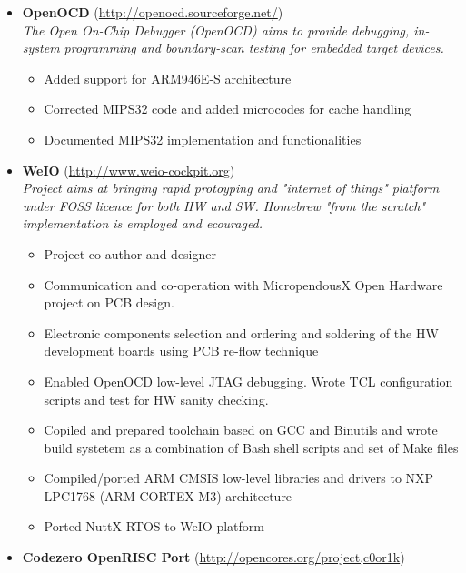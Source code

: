 \documentclass[a4paper, oneside, final]{scrartcl}
\begin{document}
\begin{itemize}
   \item \textbf{OpenOCD} (\url{http://openocd.sourceforge.net/}) \\
      \textit{The Open On-Chip Debugger (OpenOCD) aims to provide debugging,
         in-system programming and boundary-scan testing for embedded target
            devices.}
      \begin{itemize}
         \item Added support for ARM946E-S architecture
         \item Corrected MIPS32 code and added microcodes for cache handling
         \item Documented MIPS32 implementation and functionalities
      \end{itemize}
   \item \textbf{WeIO} (\url{http://www.weio-cockpit.org}) \\
      \textit{Project aims at bringing rapid protoyping and "internet of things"
         platform under FOSS licence for both HW and SW. Homebrew "from the scratch"
         implementation is employed and ecouraged.}
      \begin{itemize}
         \item Project co-author and designer
         \item Communication and co-operation with MicropendousX Open Hardware
               project on PCB design.
         \item Electronic components selection and ordering and soldering of
               the HW development boards using PCB re-flow technique
         \item Enabled OpenOCD low-level JTAG debugging. Wrote TCL
               configuration scripts and test for HW sanity checking.
         \item Copiled and prepared toolchain based on GCC and Binutils and
               wrote build systetem as a combination of Bash shell scripts and set of Make files
         \item Compiled/ported ARM CMSIS low-level libraries and drivers to NXP
                  LPC1768 (ARM CORTEX-M3) architecture
         \item Ported NuttX RTOS to WeIO platform
      \end{itemize}
   \item \textbf{Codezero OpenRISC Port} (\url{http://opencores.org/project,c0or1k}) \\

\end{itemize}
\end{document}
